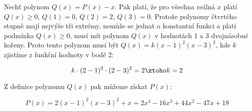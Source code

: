 \documentclass{fkssolpub}
\author{Ondřej Sedláček}
\begin{document}
Nechť polynom $Q(x) = P(x) - x$. Pak platí, že pro všechna reálná $x$ platí
$Q(x) \geq 0$, $Q(1) = 0$, $Q(2) = 2$, $Q(3) = 0$. Protože polynomy čtvrtého stupně
mají nejvýše tři extrémy, nemůže se jednat o konstantní funkci a platí
podmínka $Q(x) \geq 0$, musí mít polynom $Q(x)$ v hodnotách 1 a 3
dvojnásobné kořeny. Proto tento polynom musí být $Q(x) = k (x - 1)^2 (x - 3)^2$,
kde $k$ zjistíme z funkční hodnoty v bodě 2:

\[
	k \cdot (2 - 1)^2 \cdot (2 - 3)^2 = 2 \ztoho k = 2
\]

Z definice polynomu $Q(x)$ pak můžeme získat $P(x)$:

\[
	P(x) = 2 (x - 1)^2 (x - 3)^2 + x = 2 x^4 - 16 x^3 + 44 x^2 - 47 x + 18
\]
\end{document}
